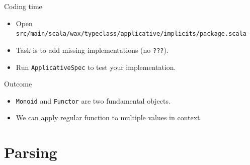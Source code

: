 \documentclass[presentation,aspectratio=169,smaller]{beamer}
\begin{document}
\begin{frame}[label={sec:orgfb446bf},fragile]{Coding time}
 \begin{itemize}
\item Open \texttt{src/main/scala/wax/typeclass/applicative/implicits/package.scala}
\item Task is to add missing implementations (no \texttt{???}).
\item Run \texttt{ApplicativeSpec} to test your implementation.
\end{itemize}
\end{frame}

\begin{frame}[label={sec:org0a8ef2f},fragile]{Outcome}
 \begin{itemize}
\item <1-> \texttt{Monoid} and \texttt{Functor} are two fundamental objects.
\item <2-> We can apply regular function to multiple values in context.
\end{itemize}
\end{frame}

\section{Parsing}
\label{sec:org66b21cd}
\end{document}
